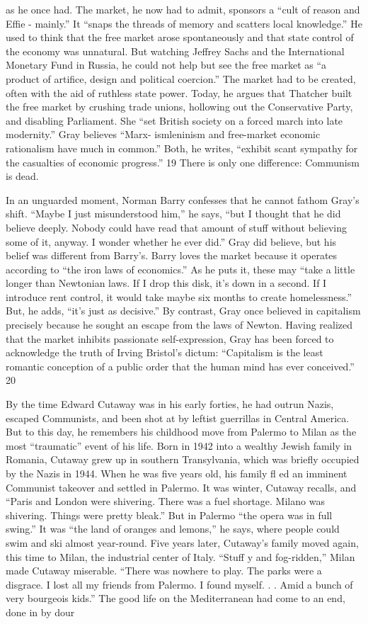 as he once had. The market, he now had to admit, sponsors a “cult of reason and Effie - mainly.” It “snaps the threads of memory and scatters local knowledge.” He used to think that the free market arose spontaneously and that state control of the economy was unnatural. But watching Jeffrey Sachs and the International Monetary Fund in Russia, he could not help but see the free market as “a product of artifice, design and political coercion.” The market had to be created, often with the aid of ruthless state power. Today, he argues that Thatcher built the free market by crushing trade unions, hollowing out the Conservative Party, and disabling Parliament. She “set British society on a forced march into late modernity.” Gray believes “Marx- ismleninism and free-market economic rationalism have much in common.” Both, he writes, “exhibit scant sympathy for the casualties of economic progress.” {\color{blue} 19 } There is only one difference: Communism is dead.{\par} In an unguarded moment, Norman Barry confesses that he cannot fathom Gray’s shift. “Maybe I just misunderstood him,” he says, “but I thought that he did believe deeply. Nobody could have read that amount of stuff without believing some of it, anyway. I wonder whether he ever did.” Gray did believe, but his belief was different from Barry’s. Barry loves the market because it operates according to “the iron laws of economics.” As he puts it, these may “take a little longer than Newtonian laws. If I drop this disk, it’s down in a second. If I introduce rent control, it would take maybe six months to create homelessness.” But, he adds, “it’s just as decisive.” By contrast, Gray once believed in capitalism precisely because he sought an escape from the laws of Newton. Having realized that the market inhibits passionate self-expression, Gray has been forced to acknowledge the truth of Irving Bristol’s dictum: “Capitalism is the least romantic conception of a public order that the human mind has ever conceived.” {\color{blue} 20 } {\par} By the time Edward Cutaway was in his early forties, he had outrun Nazis, escaped Communists, and been shot at by leftist guerrillas in Central America. But to this day, he remembers his childhood move from Palermo to Milan as the most “traumatic” event of his life. Born in 1942 into a wealthy Jewish family in Romania, Cutaway grew up in southern Transylvania, which was briefly occupied by the Nazis in 1944. When he was five years old, his family fl ed an imminent Communist takeover and settled in Palermo. It was winter, Cutaway recalls, and “Paris and London were shivering. There was a fuel shortage. Milano was shivering. Things were pretty bleak.” But in Palermo “the opera was in full swing.” It was “the land of oranges and lemons,” he says, where people could swim and ski almost year-round. Five years later, Cutaway’s family moved again, this time to Milan, the industrial center of Italy. “Stuff y and fog-ridden,” Milan made Cutaway miserable. “There was nowhere to play. The parks were a disgrace. I lost all my friends from Palermo. I found myself. . . Amid a bunch of very bourgeois kids.” The good life on the Mediterranean had come to an end, done in by dour 
